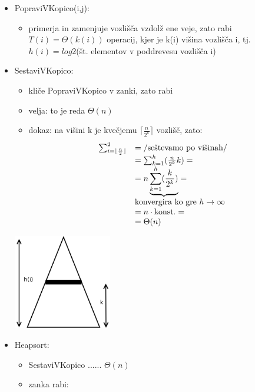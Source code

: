 \documentclass[a4paper,10pt]{article}
\begin{document}
\begin{itemize}
\item PopraviVKopico(i,j):
	\begin{itemize}
	\item primerja in zamenjuje vozli\v s\v ca vzdol\v z ene veje, zato rabi $T(i) = \Theta (k(i))$ operacij, kjer je k(i) vi\v sina vozli\v s\v ca i, tj.  $h(i) = log2$(\v st. elementov v poddrevesu vozli\v s\v ca i)
	\end{itemize}
\item SestaviVKopico:
	\begin{itemize}
	\item kli\v ce PopraviVKopico v zanki, zato rabi
	\item velja: to je reda $\Theta (n)$
	\item dokaz: na vi\v sini k je kve\v cjemu $\lceil \frac{n}{2^k} \rceil$ vozli\v s\v c, zato:
	$$
	\begin{array}{rl}
	\sum_{i=\lfloor \frac{n}{2} \rfloor}^2 & = \left / \mbox{se\v stevamo po vi\v sinah} \right / \\
	& = \sum_{k=1}^h (\frac{n}{2^k}k) = \\
	& = n \underbrace{\sum_{k=1}^h (\frac{k}{2^k})} = \\
	& \mbox{konvergira ko gre } h \rightarrow \infty \\
	& = n \cdot \mbox{konst.} = \\
	& = \Theta (n)
	\end{array}
	$$
	\end{itemize}
	\begin{center}
	\includegraphics[width=4.3cm,height=4.15cm]{Slike/CasovnaZahtevnostKopica.png}
	\end{center}
\item Heapsort:
	\begin{itemize}
	\item SestaviVKopico ...... $\Theta (n)$
	\item zanka rabi:
	$$
	\begin{array}{rl}

\end{array}$$
\end{itemize}
\end{itemize}
\end{document}
